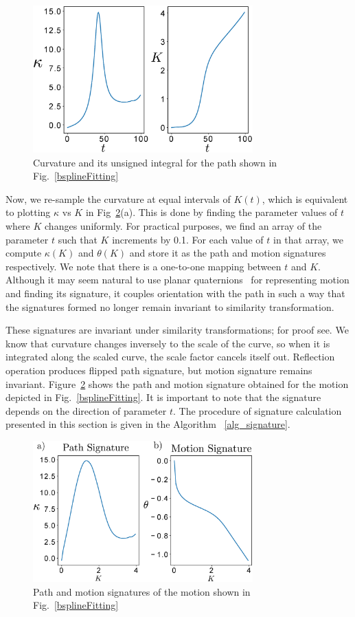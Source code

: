 \begin{figure}
\centering
\includegraphics[width=240pt]{jcise-18/figure/fig_curvatureK.eps}
  \caption{Curvature and its unsigned integral for the path shown in Fig.~\ref{bsplineFitting}}
\label{curvatureK}
\end{figure}

Now, we re-sample the curvature at equal intervals of $K(t)$, which is equivalent to plotting $\kappa$ vs $K$ in Fig~\ref{signature}(a).
This is done by finding the parameter values of $t$ where $K$ changes uniformly.
For practical purposes, we find an array of the parameter $t$ such that $K$ increments by 0.1.
For each value of $t$ in that array, we compute $\kappa(K)$ and $\theta(K)$ and store it as the path and motion signatures respectively.
We note that there is a one-to-one mapping between $t$ and $K$.
Although it may seem natural to use planar quaternions~\cite{McCarthy90, Bottema} for representing motion and finding its signature, it couples orientation with the path in such a way that the signatures formed no longer remain invariant to similarity transformation.

These signatures are invariant under similarity transformations; for proof see\cite{cui2009}.
We know that curvature changes inversely to the scale of the curve, so when it is integrated along the scaled curve, the scale factor cancels itself out. Reflection operation produces flipped path signature, but motion signature remains invariant.
Figure~\ref{signature} shows the path and motion signature obtained for the motion depicted in Fig.~\ref{bsplineFitting}. It is important to note that the signature depends on the direction of parameter $t$.
The procedure of signature calculation presented in this section is given in the Algorithm ~\ref{alg_signature}.

\begin{figure}
\centering
\includegraphics[width=240pt]{jcise-18/figure/fig_signatures.eps}
  \caption{Path and motion signatures of the motion shown in Fig.~\ref{bsplineFitting}}
\label{signature}
\end{figure}


